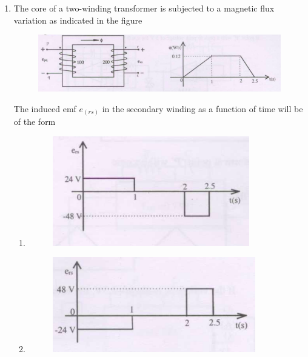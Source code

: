 \documentclass[journal,12pt,onecolumn]{IEEEtran}
\theoremstyle{remark}
\begin{document}
\begin{enumerate}[start=1, label=Q.\arabic*]
\item The core of a two-winding transformer is subjected to a magnetic flux variation as indicated in the figure

\begin{figure}[H]
    \centering
    \includegraphics[width=\columnwidth]{Fig/q49.png}
    \caption{}
\end{figure}
The induced emf $e_(rs)$ in the secondary winding as a function of time will be of the form
\begin{enumerate}
        
    \item 
    \begin{figure}[H]
        \includegraphics[width=\columnwidth]{Fig/q49-A.png}
        \caption{}
    \end{figure}


    \item 
    \begin{figure}[H]
        \includegraphics[width=\columnwidth]{Fig/q49-B.png}
        \caption{}
    \end{figure}


\end{enumerate}
\end{enumerate}
\end{document}
